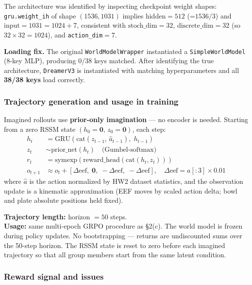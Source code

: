\documentclass[11pt,letterpaper]{article}
\begin{document}
The architecture was identified by inspecting checkpoint weight shapes: \texttt{gru.weight\_ih} of shape $(1536, 1031)$ implies hidden$=512$ (=$1536/3$) and input$=1031=1024+7$, consistent with $\text{stoch\_dim}=32$, $\text{discrete\_dim}=32$ (so $32\times32=1024$), and \texttt{action\_dim}$=7$.

\textbf{Loading fix.} The original \texttt{WorldModelWrapper} instantiated a \texttt{SimpleWorldModel} (8-key MLP), producing 0/38 keys matched. After identifying the true architecture, \texttt{DreamerV3} is instantiated with matching hyperparameters and all \textbf{38/38 keys} load correctly.

\subsubsection{Trajectory generation and usage in training}

Imagined rollouts use \textbf{prior-only imagination} — no encoder is needed. Starting from a zero RSSM state $(h_0=\mathbf{0},\,z_0=\mathbf{0})$, each step:
\begin{align*}
  h_t &= \text{GRU}(\text{cat}(z_{t-1},\,\hat{a}_{t-1}),\;h_{t-1}) \\
  z_t &\sim \text{prior\_net}(h_t) \quad \text{(Gumbel-softmax)} \\
  r_t &= \text{symexp}\!\left(\text{reward\_head}(\text{cat}(h_t, z_t))\right) \\
  o_{t+1} &\approx o_t + [\Delta\text{eef},\;\mathbf{0},\;-\Delta\text{eef},\;-\Delta\text{eef}], \quad \Delta\text{eef} = a[:3]\times 0.01
\end{align*}
where $\hat{a}$ is the action normalized by HW2 dataset statistics, and the observation update is a kinematic approximation (EEF moves by scaled action delta; bowl and plate absolute positions held fixed).

\textbf{Trajectory length:} horizon $= 50$ steps.\\
\textbf{Usage:} same multi-epoch GRPO procedure as \S2(c). The world model is frozen during policy updates. No bootstrapping — returns are undiscounted sums over the 50-step horizon. The RSSM state is reset to zero before each imagined trajectory so that all group members start from the same latent condition.

\subsubsection{Reward signal and issues}
\end{document}
